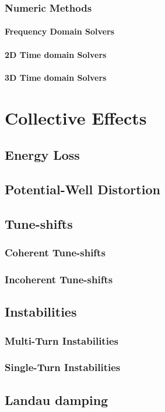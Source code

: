 \documentclass[
	12pt,				%
	openright,			%
	oneside,			%
	a4paper,		%
	chapter=TITLE,		%
	section=TITLE,		%
    brazil,				%
	english,			%
	sumario=tradicional,
	]{abntex2}
\begin{document}
    \subsection{Numeric Methods}
      \subsubsection{Frequency Domain Solvers}
      \subsubsection{2D Time domain Solvers}
      \subsubsection{3D Time domain Solvers}

\chapter{Collective Effects}
  \section{Energy Loss}
  \section{Potential-Well Distortion}
  \section{Tune-shifts}
    \subsection{Coherent Tune-shifts}
    \subsection{Incoherent Tune-shifts}
  \section{Instabilities}
    \subsection{Multi-Turn Instabilities}
    \subsection{Single-Turn Instabilities}
  \section{Landau damping}
\end{document}
